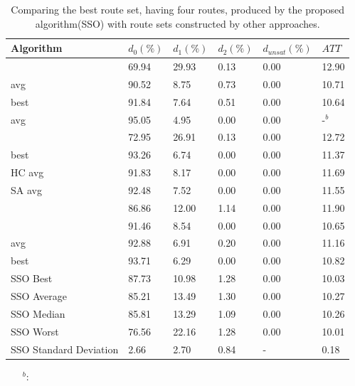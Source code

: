 \begin{table}[H]
	\centering
    \hspace*{-1.0cm}
    \begin{tabular}{|l||l|l|l|l|l|}
 	\hline
 	Algorithm & $d_0(\%)$ & $d_1(\%)$ & $d_2(\%)$ & $d_{unsat}(\%)$ & $ATT$ \\
 	\hline
    \citet{mandl79} & 69.94 & 29.93 & 0.13 & 0.00 & 12.90 \\
    \citet{kechagiopoulos14} avg & 90.52 & 8.75 & 0.73 & 0.00 & 10.71 \\
    \citet{kechagiopoulos14} best & 91.84 & 7.64 & 0.51 & 0.00 & 10.64 \\
    \citet{nikolic14} avg & 95.05 & 4.95 & 0.00 & 0.00 & -$^b$ \\
    \citet{kidwai98} & 72.95 & 26.91 & 0.13 & 0.00 & 12.72 \\
    \citet{fan10} best & 93.26 & 6.74 & 0.00 & 0.00 & 11.37 \\
    \citet{fan10} HC avg & 91.83 & 8.17 & 0.00 & 0.00 & 11.69 \\
    \citet{fan10} SA avg & 92.48 & 7.52 & 0.00 & 0.00 & 11.55 \\
    \citet{chakroborty02} & 86.86 & 12.00 & 1.14 & 0.00 & 11.90 \\
    \citet{zhang10} & 91.46 & 8.54 & 0.00 & 0.00 & 10.65 \\
    \citet{chew12} avg & 92.88 & 6.91 & 0.20 & 0.00 & 11.16 \\
    \citet{chew12} best & 93.71 & 6.29 & 0.00 & 0.00 & 10.82 \\
	\hline
    \hline
    SSO Best & 87.73 & 10.98 & 1.28 & 0.00 & 10.03\\
    SSO Average & 85.21 & 13.49 & 1.30 & 0.00 & 10.27\\
    SSO Median & 85.81 & 13.29 & 1.09 & 0.00 & 10.26\\
    SSO Worst & 76.56 & 22.16 & 1.28 & 0.00 & 10.01\\
    SSO Standard Deviation & 2.66 & 2.70 & 0.84 & - & 0.18\\
    \hline
    \end{tabular}
    \caption {Comparing the best route set, having four routes, produced by the proposed algorithm(SSO) with route sets constructed by other approaches.}
    \begin{itemize}[noitemsep]
    \item[$^b$:] 
    \end{itemize}
    \label{table:performanceComparison_4}
\end{table}


